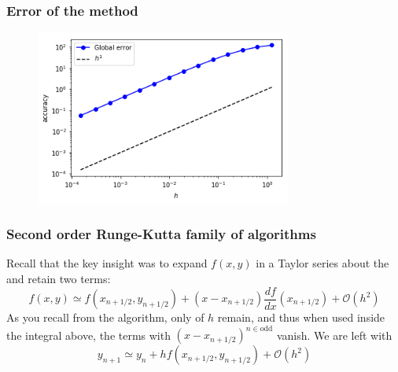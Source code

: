 \documentclass[hyperref={colorlinks=true}]{beamer}
\begin{document}

\begin{frame}
  \frametitle{Error of the method}

  \begin{figure}
    \centering
    \includegraphics[width=0.75\textwidth]{ExplictEulerAccuracyVsh.png}
  \end{figure}

\end{frame}



\begin{frame}%
  \frametitle{Second order Runge-Kutta family of algorithms} 

  Recall that the key insight was to expand $f(x,y)$ in a Taylor series about the  and retain two
terms:
  \begin{equation}
    f(x,y) \simeq f(x_{n+1/2} , y_{n+1/2}) + (x - x_{n+1/2}) \frac{df}{dx}(x_{n+1/2}) + \mathcal{O}(h^2)
  \end{equation}
  As you recall from the  algorithm, only  of $h$ remain, and thus when used inside the integral above, the terms with $(x - x_{n+1/2})^{n\in\mathrm{odd}}$ vanish. We are left with
  \begin{equation}
    y_{n+1} \simeq y_{n} + h f(x_{n+1/2} , y_{n+1/2}) + \mathcal{O}(h^2) 
  \end{equation}
  
  \centering \Large {}

\end{frame}

\end{document}
